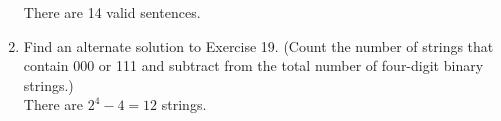 \documentclass[10pt]{article}
\begin{document}
\begin{enumerate}
\begin{tikzpicture}
  \end{tikzpicture}
  There are 14 valid sentences.

\setcounter{enumi}{19}
  \item Find an alternate solution to Exercise 19. (Count the number of strings that contain 000 or 111 and subtract from the total number of four-digit binary strings.)\\
  There are $2^4 - 4 = 12$ strings.
\end{enumerate}
\end{document}
